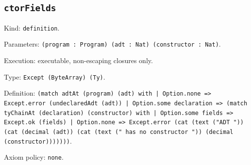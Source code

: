 \documentclass[11pt]{article}
\begin{document}
\subsection*{\texttt{ctorFields}}
\noindent Kind: \texttt{definition}.\par
\noindent Parameters: \texttt{(program : Program) (adt : Nat) (constructor : Nat)}.\par
\noindent Execution: executable, non-escaping closures only.\par
\noindent Type: \texttt{Except (ByteArray) (Ty)}.\par
\noindent Definition: \texttt{(match adtAt (program) (adt) with | Option.none => Except.error (undeclaredAdt (adt)) | Option.some declaration => (match tyChainAt (declaration) (constructor) with | Option.some fields => Except.ok (fields) | Option.none => Except.error (cat (text ("ADT ")) (cat (decimal (adt)) (cat (text (" has no constructor ")) (decimal (constructor)))))))}.\par
\noindent Axiom policy: \texttt{none}.\par
\end{document}
